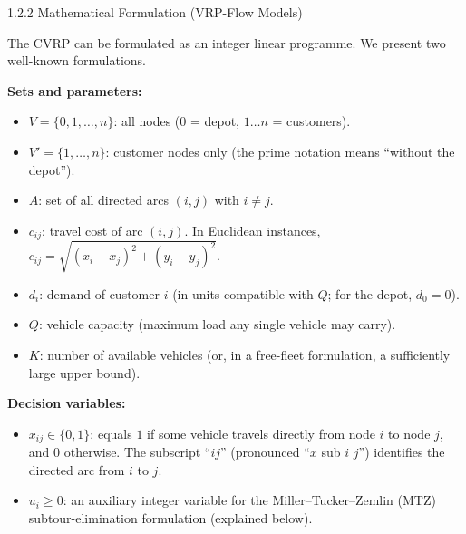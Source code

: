 \documentclass[aspectratio=169,10pt]{beamer}
\begin{document}
\begin{frame}[allowframebreaks]{1.2.2 Mathematical Formulation (VRP-Flow Models)}

The CVRP can be formulated as an integer linear programme.  We present two
well-known formulations.

\medskip
\textbf{Sets and parameters:}
\begin{itemize}
  \item $V = \{0, 1, \ldots, n\}$: all nodes ($0$ = depot, $1\ldots n$ = customers).
  \item $V' = \{1, \ldots, n\}$: customer nodes only (the prime notation means
        ``without the depot'').
  \item $A$: set of all directed arcs $(i,j)$ with $i \neq j$.
  \item $c_{ij}$: travel cost of arc $(i,j)$.  In Euclidean instances,
        $c_{ij} = \sqrt{(x_i - x_j)^2 + (y_i - y_j)^2}$.
  \item $d_i$: demand of customer $i$ (in units compatible with $Q$; for the depot, $d_0 = 0$).
  \item $Q$: vehicle capacity (maximum load any single vehicle may carry).
  \item $K$: number of available vehicles (or, in a free-fleet formulation, a
        sufficiently large upper bound).
\end{itemize}

\textbf{Decision variables:}
\begin{itemize}
  \item $x_{ij} \in \{0, 1\}$: equals $1$ if some vehicle travels directly from
        node $i$ to node $j$, and $0$ otherwise.
        The subscript ``$ij$'' (pronounced ``$x$ sub $i$ $j$'') identifies the
        directed arc from $i$ to $j$.
  \item $u_i \geq 0$: an auxiliary integer variable for the Miller--Tucker--Zemlin
        (MTZ) subtour-elimination formulation (explained below).
\end{itemize}

\framebreak


\end{frame}
\end{document}
